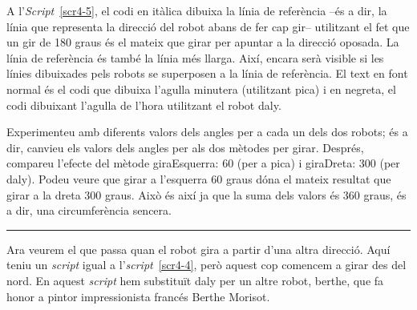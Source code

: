 A l'\emph{Script}~\ref{scr4-5}, el codi en itàlica dibuixa la línia de referència --és a dir, la línia que representa la direcció del robot abans de fer cap gir-- utilitzant el fet que un gir de 180 graus és el mateix que girar per apuntar a la direcció oposada. La línia de referència és també la línia més llarga. Així, encara serà visible si les línies dibuixades pels robots se superposen a la línia de referència. El text en font normal és el codi que dibuixa l'agulla minutera (utilitzant \textsf{pica}) i en negreta, el codi dibuixant l'agulla de l'hora utilitzant el robot \textsf{daly}.   

\begin{center}
\colorbox{black}{}
\end{center}
{\small
\noindent
Experimenteu amb diferents valors dels angles per a cada un dels dos robots; és a dir, canvieu els valors dels angles per als dos mètodes per girar. Després, compareu l'efecte del mètode \textsf{giraEsquerra: 60} (per a  \textsf{pica}) i  \textsf{giraDreta: 300} (per  \textsf{daly}). Podeu veure que girar a l'esquerra 60 graus dóna el mateix resultat que girar a la dreta 300 graus. Això és així ja que la suma dels valors és 360 graus, és a dir, una circumferència sencera.}\\
\noindent
\rule{\textwidth}{3pt}

\vspace*{5mm}

Ara veurem el que passa quan el robot gira a partir d'una altra direcció. Aquí teniu un \emph{script} igual a  l'\emph{script}~\ref{scr4-4}, però aquest cop comencem a girar des del nord. En aquest \emph{script} hem substituït \textsf{daly} per un altre robot, \textsf{berthe}, que 
fa honor a pintor impressionista francés Berthe Morisot.

\vspace*{5mm}

